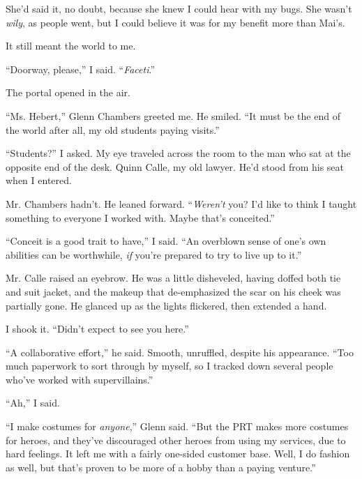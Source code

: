 She'd said it, no doubt, because she knew I could hear with my bugs.  She wasn't \emph{wily}, as people went, but I could believe it was for my benefit more than Mai's.



It still meant the world to me.



``Doorway, please,'' I said.  ``\emph{Faceti}.''



The portal opened in the air.



\blacksquare



``Ms. Hebert,'' Glenn Chambers greeted me.  He smiled.  ``It must be the end of the world after all, my old students paying visits.''



``Students?'' I asked.  My eye traveled across the room to the man who sat at the opposite end of the desk.  Quinn Calle, my old lawyer.  He'd stood from his seat when I entered.



Mr. Chambers hadn't.  He leaned forward.  ``\emph{Weren't} you?  I'd like to think I taught something to everyone I worked with.  Maybe that's conceited.''



``Conceit is a good trait to have,'' I said.  ``An overblown sense of one's own abilities can be worthwhile, \emph{if} you're prepared to try to live up to it.''



Mr. Calle raised an eyebrow.  He was a little disheveled, having doffed both tie and suit jacket, and the makeup that de-emphasized the scar on his cheek was partially gone.  He glanced up as the lights flickered, then extended a hand.



I shook it.  ``Didn't expect to see you here.''



``A collaborative effort,'' he said.  Smooth, unruffled, despite his appearance.  ``Too much paperwork to sort through by myself, so I tracked down several people who've worked with supervillains.''



``Ah,'' I said.



``I make costumes for \emph{anyone},'' Glenn said.  ``But the PRT makes more costumes for heroes, and they've discouraged other heroes from using my services, due to hard feelings.  It left me with a fairly one-sided customer base.  Well, I do fashion as well, but that's proven to be more of a hobby than a paying venture.''



